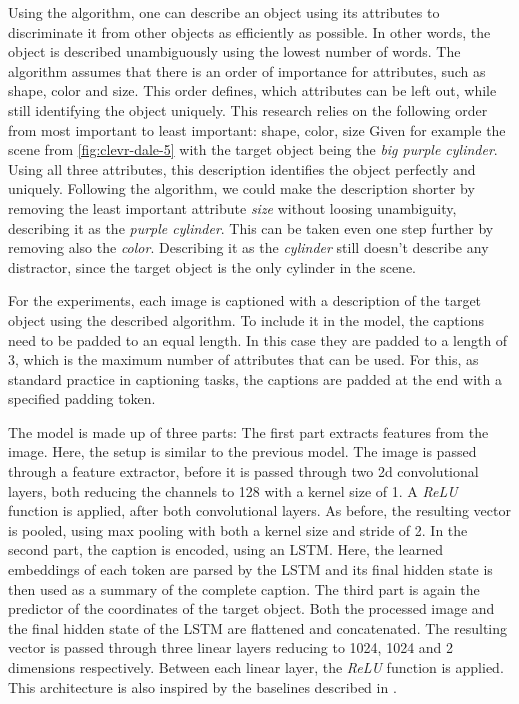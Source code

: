 Using the algorithm, one can describe an object using its attributes to discriminate it from other objects as efficiently as possible.
In other words, the object is described unambiguously using the lowest number of words.
The algorithm assumes that there is an order of importance for attributes, such as shape, color and size.
This order defines, which attributes can be left out, while still identifying the object uniquely.
This research relies on the following order from most important to least important: shape, color, size
Given for example the scene from \ref{fig:clevr-dale-5} with the target object being the \emph{big purple cylinder}.
Using all three attributes, this description identifies the object perfectly and uniquely.
Following the algorithm, we could make the description shorter by removing the least important attribute \emph{size} without loosing unambiguity, describing it as the \emph{purple cylinder}.
This can be taken even one step further by removing also the \emph{color}.
Describing it as the \emph{cylinder} still doesn't describe any distractor, since the target object is the only cylinder in the scene.

For the experiments, each image is captioned with a description of the target object using the described algorithm.
To include it in the model, the captions need to be padded to an equal length.
In this case they are padded to a length of 3, which is the maximum number of attributes that can be used.
For this, as standard practice in captioning tasks, the captions are padded at the end with a specified padding token.

The model is made up of three parts:
The first part extracts features from the image.
Here, the setup is similar to the previous model.
The image is passed through a feature extractor, before it is passed through two 2d convolutional layers, both reducing the channels to 128 with a kernel size of 1.
A \emph{ReLU} function is applied, after both convolutional layers.
As before, the resulting vector is pooled, using max pooling with both a kernel size and stride of 2.
In the second part, the caption is encoded, using an LSTM.
Here, the learned embeddings of each token are parsed by the LSTM and its final hidden state is then used as a summary of the complete caption.
The third part is again the predictor of the coordinates of the target object.
Both the processed image and the final hidden state of the LSTM are flattened and concatenated.
The resulting vector is passed through three linear layers reducing to 1024, 1024 and 2 dimensions respectively.
Between each linear layer, the \emph{ReLU} function is applied.
This architecture is also inspired by the baselines described in \citet{Johnson2017}.

